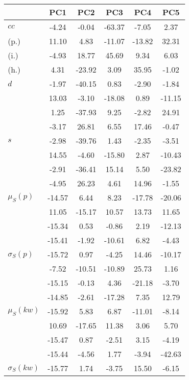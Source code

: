 \begin{table}[h!]
\begin{center}
\begin{tabular}{| l | c | c | c | c | c |}\hline
 & PC1 & PC2 & PC3 & PC4 & PC5 \\\hline
$cc$ & -4.24  & -0.04  & -63.37  & -7.05  & 2.37 \\\hline
(p.) & 11.10  & 4.83  & -11.07  & -13.82  & 32.31 \\\hline
(i.) & -4.93  & 18.77  & 45.69  & 9.34  & 6.03 \\\hline
(h.) & 4.31  & -23.92  & 3.09  & 35.95  & -1.02 \\\hline
$d$ & -1.97  & -40.15  & 0.83  & -2.90  & -1.84 \\\hline
 & 13.03  & -3.10  & -18.08  & 0.89  & -11.15 \\\hline
 & 1.25  & -37.93  & 9.25  & -2.82  & 24.91 \\\hline
 & -3.17  & 26.81  & 6.55  & 17.46  & -0.47 \\\hline
$s$ & -2.98  & -39.76  & 1.43  & -2.35  & -3.51 \\\hline
 & 14.55  & -4.60  & -15.80  & 2.87  & -10.43 \\\hline
 & -2.91  & -36.41  & 15.14  & 5.50  & -23.82 \\\hline
 & -4.95  & 26.23  & 4.61  & 14.96  & -1.55 \\\hline
$\mu_S(p)$ & -14.57  & 6.44  & 8.23  & -17.78  & -20.06 \\\hline
 & 11.05  & -15.17  & 10.57  & 13.73  & 11.65 \\\hline
 & -15.34  & 0.53  & -0.86  & 2.19  & -12.13 \\\hline
 & -15.41  & -1.92  & -10.61  & 6.82  & -4.43 \\\hline
$\sigma_S(p)$ & -15.72  & 0.97  & -4.25  & 14.46  & -10.17 \\\hline
 & -7.52  & -10.51  & -10.89  & 25.73  & 1.16 \\\hline
 & -15.15  & -0.13  & 4.36  & -21.18  & -3.70 \\\hline
 & -14.85  & -2.61  & -17.28  & 7.35  & 12.79 \\\hline
$\mu_S(kw)$ & -15.92  & 5.83  & 6.87  & -11.01  & -8.14 \\\hline
 & 10.69  & -17.65  & 11.38  & 3.06  & 5.70 \\\hline
 & -15.47  & 0.87  & -2.51  & 3.15  & -4.19 \\\hline
 & -15.44  & -4.56  & 1.77  & -3.94  & -42.63 \\\hline
$\sigma_S(kw)$ & -15.77  & 1.74  & -3.75  & 15.50  & -6.15 \\\hline

\end{tabular}
\end{center}
\end{table}
